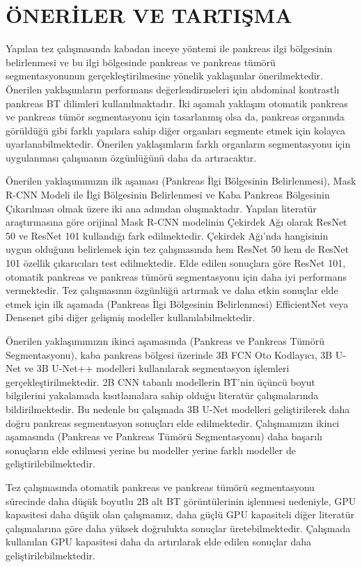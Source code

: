 \chapter{ÖNERİLER VE TARTIŞMA \label{sec:Oneriler}}

Yapılan tez çalışmasında kabadan inceye yöntemi ile pankreas ilgi bölgesinin belirlenmesi ve bu ilgi bölgesinde pankreas ve pankreas tümörü segmentasyonunun gerçekleştirilmesine yönelik yaklaşımlar önerilmektedir. Önerilen yaklaşımların performans değerlendirmeleri için abdominal kontrastlı pankreas BT dilimleri kullanılmaktadır.  İki aşamalı yaklaşım otomatik  pankreas  ve pankreas tümör segmentasyonu  için  tasarlanmış olsa  da, pankreas organında görüldüğü gibi farklı yapılara sahip diğer organları segmente etmek için kolayca uyarlanabilmektedir. Önerilen yaklaşımların farklı organların segmentasyonu için uygulanması çalışmanın özgünlüğünü daha da artıracaktır. 

Önerilen yaklaşımımızın ilk aşaması (Pankreas İlgi Bölgesinin Belirlenmesi), Mask R-CNN Modeli ile İlgi Bölgesinin Belirlenmesi ve Kaba Pankreas Bölgesinin Çıkarılması olmak üzere iki ana adımdan oluşmaktadır. Yapılan literatür araştırmasına göre orijinal Mask R-CNN modelinin Çekirdek Ağı olarak ResNet 50 ve ResNet 101 kullandığı fark edilmektedir. Çekirdek Ağı’nda hangisinin uygun olduğunu belirlemek için tez çalışmasında hem ResNet 50 hem de ResNet 101 özellik çıkarıcıları test edilmektedir. Elde edilen sonuçlara göre ResNet 101, otomatik pankreas ve pankreas tümörü segmentasyonu için daha iyi performans vermektedir. Tez çalışmasının özgünlüğü artırmak ve daha etkin sonuçlar elde etmek için ilk aşamada (Pankreas İlgi Bölgesinin Belirlenmesi) EfficientNet veya Densenet gibi diğer gelişmiş modeller kullanılabilmektedir.

Önerilen yaklaşımımızın ikinci aşamasında (Pankreas ve Pankreas Tümörü Segmentasyonu), kaba pankreas bölgesi üzerinde 3B FCN Oto Kodlayıcı, 3B U-Net ve 3B U-Net++ modelleri kullanılarak segmentasyon işlemleri gerçekleştirilmektedir. 2B CNN tabanlı modellerin BT'nin üçüncü boyut bilgilerini yakalamada kısıtlamalara sahip olduğu literatür çalışmalarında bildirilmektedir. Bu nedenle bu çalışmada 3B U-Net modelleri geliştirilerek daha doğru pankreas segmentasyon sonuçları elde edilmektedir. Çalışmamızın ikinci aşamasında (Pankreas ve Pankreas Tümörü Segmentasyonu) daha başarılı sonuçların elde edilmesi yerine bu modeller yerine farklı modeller de geliştirilebilmektedir. 

Tez çalışmasında otomatik pankreas ve pankreas tümörü segmentasyonu sürecinde daha düşük boyutlu 2B alt BT görüntülerinin işlenmesi nedeniyle, GPU kapasitesi daha düşük olan çalışmamız, daha güçlü GPU kapasiteli diğer literatür çalışmalarına göre daha yüksek doğrulukta sonuçlar üretebilmektedir. Çalışmada kullanılan GPU kapasitesi daha da artırılarak elde edilen sonuçlar daha geliştirilebilmektedir. 

